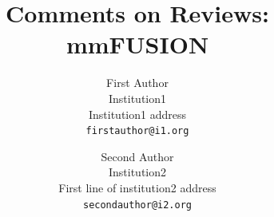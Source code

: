 \documentclass[10pt,twocolumn,letterpaper]{article}
\begin{document}
\title{Comments on Reviews: mmFUSION}

\author{First Author\\
Institution1\\
Institution1 address\\
{\tt\small firstauthor@i1.org}
\and
Second Author\\
Institution2\\
First line of institution2 address\\
{\tt\small secondauthor@i2.org}
}
\maketitle
\end{document}
